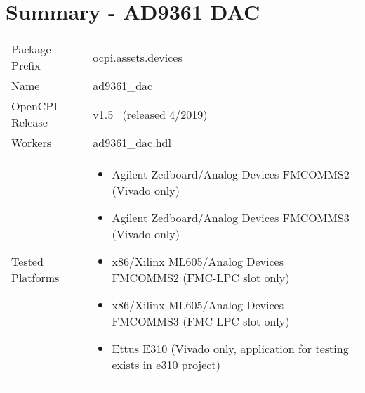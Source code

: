 \documentclass{article}
\author{} %
\date{Version \docVersion} %
\title{\docTitle}
\def\docVersion{1.5}
\def\comp{ad9361\_dac}
\def\Comp{AD9361 DAC}
\begin{document}
\section*{Summary - \Comp}
\begin{longtable}{|p{}
                  |p{}|}
	\hline
	\rowcolor{blue}
	                  &                  \\
	\hline
	Package Prefix    & ocpi.assets.devices     \\
	\hline
	Name              & \comp            \\
	\hline
	OpenCPI Release & v\docVersion ~ (released 4/2019) \\
	\hline
	Workers           & \comp.hdl        \\
	\hline
	Tested Platforms  &
\begin{itemize}
  \item Agilent Zedboard/Analog Devices FMCOMMS2 (Vivado only)
  \item Agilent Zedboard/Analog Devices FMCOMMS3 (Vivado only)
  \item x86/Xilinx ML605/Analog Devices FMCOMMS2 (FMC-LPC slot only)
  \item x86/Xilinx ML605/Analog Devices FMCOMMS3 (FMC-LPC slot only)
  \item Ettus E310 (Vivado only, application for testing exists in e310 project)
\end{itemize} \\
	\hline
\end{longtable}
\end{document}
